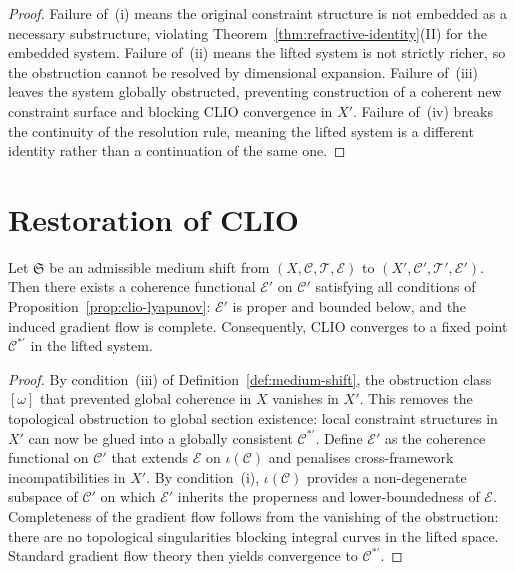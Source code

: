 \documentclass[11pt,openany]{book}
\begin{document}
\begin{proof}
Failure of~(i) means the original constraint structure is
not embedded as a necessary substructure, violating
Theorem~\ref{thm:refractive-identity}(II) for the embedded
system.  Failure of~(ii) means the lifted system is not
strictly richer, so the obstruction cannot be resolved by
dimensional expansion.  Failure of~(iii) leaves the system
globally obstructed, preventing construction of a coherent
new constraint surface and blocking CLIO convergence in
$X'$.  Failure of~(iv) breaks the continuity of the
resolution rule, meaning the lifted system is a different
identity rather than a continuation of the same one.
\end{proof}

\section{Restoration of CLIO}
\label{sec:clio-restoration}

\begin{theorem}
\label{thm:clio-restoration}
Let $\mathfrak{S}$ be an admissible medium shift from
$(X, \mathcal{C}, \mathcal{T}, \mathcal{E})$ to
$(X', \mathcal{C}', \mathcal{T}', \mathcal{E}')$.  Then
there exists a coherence functional $\mathcal{E}'$ on
$\mathcal{C}'$ satisfying all conditions of
Proposition~\ref{prop:clio-lyapunov}: $\mathcal{E}'$ is
proper and bounded below, and the induced gradient flow is
complete.  Consequently, CLIO converges to a fixed point
$\mathcal{C}^{*\prime}$ in the lifted system.
\end{theorem}

\begin{proof}
By condition~(iii) of Definition~\ref{def:medium-shift},
the obstruction class $[\omega]$ that prevented global
coherence in $X$ vanishes in $X'$.  This removes the
topological obstruction to global section existence:
local constraint structures in $X'$ can now be glued into
a globally consistent $\mathcal{C}^{*\prime}$.  Define
$\mathcal{E}'$ as the coherence functional on $\mathcal{C}'$
that extends $\mathcal{E}$ on $\iota(\mathcal{C})$ and
penalises cross-framework incompatibilities in $X'$.  By
condition~(i), $\iota(\mathcal{C})$ provides a
non-degenerate subspace of $\mathcal{C}'$ on which
$\mathcal{E}'$ inherits the properness and lower-boundedness
of $\mathcal{E}$.  Completeness of the gradient flow follows
from the vanishing of the obstruction: there are no
topological singularities blocking integral curves in the
lifted space.  Standard gradient flow theory then yields
convergence to $\mathcal{C}^{*\prime}$.
\end{proof}
\end{document}
